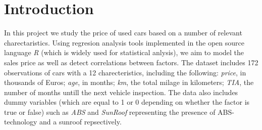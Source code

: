 \section{Introduction}

In this project we study the price of used cars based on a number of relevant charectaristics. Using regresion analysis tools implemented in the open source language \textit{R} (which is widely used for statistical anlysis), we aim to model the sales price as well as detect correlations between factors. The dataset includes 172 observations of cars with a 12 charecteristics, including the following: \textit{price}, in thousands of Euros; \textit{age}, in months; \textit{km}, the total milage in kilometers; \textit{TIA}, the number of months untill the next vehicle inspection. The data also includes dummy variables (which are equal to 1 or 0 depending on whether the factor is true or false) such as \textit{ABS} and \textit{SunRoof} representing the presence of ABS-technology and a sunroof repsectively.